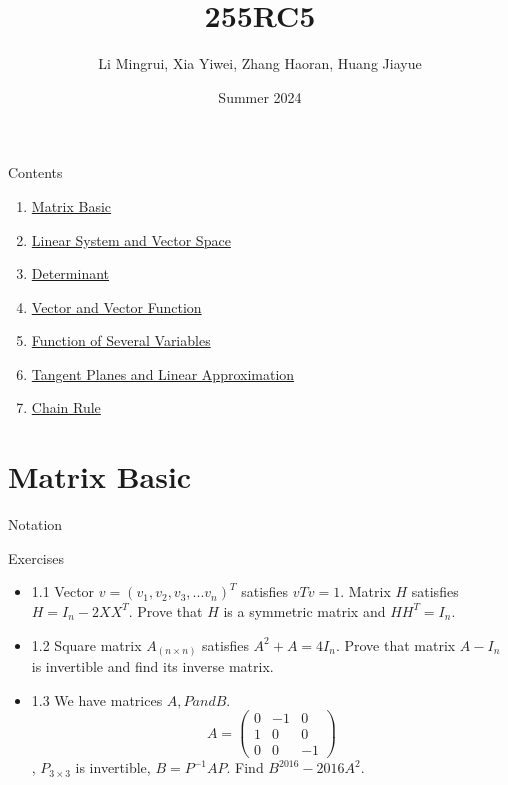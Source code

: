 \documentclass[aspectratio=169, UTF8]{ctexbeamer}
\title{\LARGE 255RC5}
\author{ Li Mingrui, Xia Yiwei, Zhang Haoran, Huang Jiayue}
\date{Summer 2024}
\begin{document}
\maketitle



\begin{frame}{Contents}
    \begin{enumerate}
        \item \hyperlink{1}{Matrix Basic}
        \item \hyperlink{2}{Linear System and Vector Space}
        \item \hyperlink{3}{Determinant}
        \item \hyperlink{4}{Vector and Vector Function}
        \item \hyperlink{5}{Function of Several Variables}
        \item \hyperlink{6}{Tangent Planes and Linear Approximation}
        \item \hyperlink{7}{Chain Rule} 
    \end{enumerate}
       
\end{frame}

\section{Matrix Basic} 
\begin{frame}[label=1]{Notation}
  
\end{frame}

\begin{frame}{Exercises}
\begin{itemize}
    \item {1.1} Vector $v=(v_1,v_2,v_3,...v_n)^T$ satisfies $vTv=1$. Matrix $H$ satisfies $H=I_n-2XX^T$. Prove that $H$ is a symmetric matrix and $HH^T=I_n$.
    \item {1.2} Square matrix $A_(n\times n)$ satisfies $A^2+A=4I_n$. Prove that matrix $A-I_n$ is invertible and find its inverse matrix.
    \item {1.3} We have matrices $A,P and B$.
        \begin{equation*}
        A=\begin{pmatrix}
            0&-1&0\\
            1&0&0\\
            0&0&-1
        \end{pmatrix}
        \end{equation*}, $P_{3\times 3}$ is invertible, $B=P^{-1}AP$. Find $B^{2016}-2016A^2$.  
\end{itemize}    
\end{frame}
\end{document}
